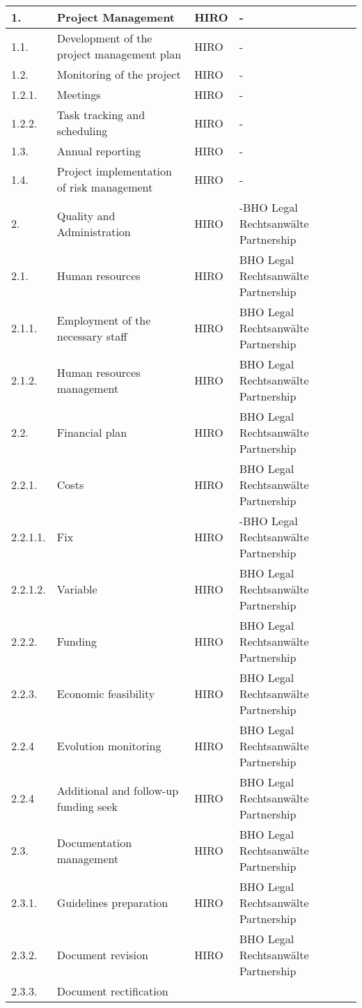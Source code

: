 \begin{longtable}[H]{l p{4cm} p{3.8cm} p{4cm}}
	1. & Project Management &HIRO&-
	\\  \midrule
	1.1. & Development of the project management plan &
	HIRO&-
	\\ \midrule
	1.2. & Monitoring of the project & 
	HIRO&-\\ \midrule
	1.2.1. & Meetings &
	HIRO&-
	\\ \midrule
	1.2.2. & Task tracking and scheduling &
	HIRO&-
	\\ \midrule
	1.3. & Annual reporting &
	HIRO&-
	\\ \midrule
	1.4. & Project implementation of risk management & 
	HIRO&-
	\\ \midrule
	2. & Quality and Administration & 
	HIRO&-BHO Legal Rechtsanwälte Partnership
	\\ \midrule
	2.1. & Human resources &
	HIRO&BHO Legal Rechtsanwälte Partnership
	\\ \midrule
	2.1.1. & Employment of the necessary staff & 
	HIRO&BHO Legal Rechtsanwälte Partnership
	\\ \midrule
	2.1.2. & Human resources management &
	HIRO&BHO Legal Rechtsanwälte Partnership
	\\ \midrule
	2.2. & Financial plan &
	HIRO&BHO Legal Rechtsanwälte Partnership
	\\ \midrule
	2.2.1. & Costs &
	HIRO&BHO Legal Rechtsanwälte Partnership
	\\ \midrule
	2.2.1.1. & Fix &
	HIRO&-BHO Legal Rechtsanwälte Partnership
	\\ \midrule
	2.2.1.2. & Variable &
	HIRO&BHO Legal Rechtsanwälte Partnership
	\\ \midrule
	2.2.2. & Funding &
	HIRO&BHO Legal Rechtsanwälte Partnership
	\\ \midrule
	2.2.3. & Economic feasibility &
	HIRO&BHO Legal Rechtsanwälte Partnership
	\\ \midrule
	2.2.4 & Evolution monitoring &
	HIRO&BHO Legal Rechtsanwälte Partnership
	\\ \midrule
	2.2.4 & Additional and follow-up funding seek &
	HIRO&BHO Legal Rechtsanwälte Partnership
	\\ \midrule
	2.3. & Documentation management &
	HIRO&BHO Legal Rechtsanwälte Partnership
	\\ \midrule
	2.3.1. & Guidelines preparation &
	HIRO&BHO Legal Rechtsanwälte Partnership
	\\ \midrule
	2.3.2. & Document revision &
	HIRO&BHO Legal Rechtsanwälte Partnership
	\\ \midrule
	2.3.3. & Document rectification &

\end{longtable}
